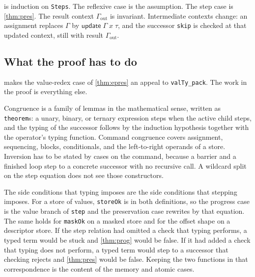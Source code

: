 \documentclass[a4paper,UKenglish,anonymous,cleveref,autoref]{lipics-v2021}
\begin{document}
 is induction on \texttt{Steps}.
The reflexive case is the assumption.
The step case is \cref{thm:pres}.
The result context \(\Gamma_{\mathrm{out}}\) is invariant.
Intermediate contexts change: an assignment replaces \(\Gamma\) by \(\mathsf{update}\;\Gamma\;x\;\tau\), and the successor \texttt{skip} is checked at that updated context, still with result \(\Gamma_{\mathrm{out}}\).

\subsection{What the proof has to do}
\label{sec:proof-work}

 makes the value-redex case of \cref{thm:epres} an appeal to \texttt{valTy\_pack}.
The work in the proof is everything else.

Congruence is a family of lemmas in the mathematical sense, written as \texttt{theorem}s: a unary, binary, or ternary expression steps when the active child steps, and the typing of the successor follows by the induction hypothesis together with the operator's typing function.
Command congruence covers assignment, sequencing, blocks, conditionals, and the left-to-right operands of a store.
Inversion has to be stated by cases on the command, because a barrier and a finished loop step to a concrete successor with no recursive call.
A wildcard split on the step equation does not see those constructors.

The side conditions that typing imposes are the side conditions that stepping imposes.
For a store of values, \texttt{storeOk} is in both definitions, so the progress case is the value branch of \texttt{step} and the preservation case rewrites by that equation.
The same holds for \texttt{maskOk} on a masked store and for the offset shape on a descriptor store.
If the step relation had omitted a check that typing performs, a typed term would be stuck and \cref{thm:prog} would be false.
If it had added a check that typing does not perform, a typed term would step to a successor that checking rejects and \cref{thm:pres} would be false.
Keeping the two functions in that correspondence is the content of the memory and atomic cases.
\end{document}
